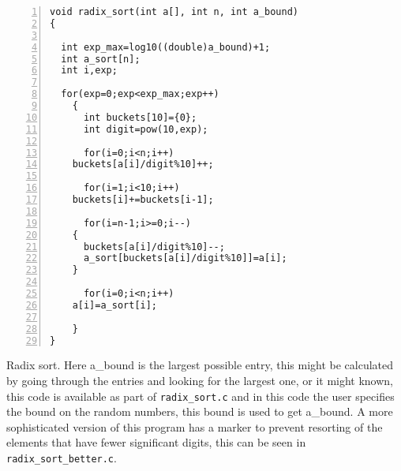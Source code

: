 \documentclass[11pt,a4paper]{scrartcl}
\begin{document}
\begin{table}
\begin{lstlisting}[numbers=left]
void radix_sort(int a[], int n, int a_bound)
{

  int exp_max=log10((double)a_bound)+1;
  int a_sort[n];
  int i,exp;

  for(exp=0;exp<exp_max;exp++)
    {
      int buckets[10]={0};
      int digit=pow(10,exp);

      for(i=0;i<n;i++)
	buckets[a[i]/digit%10]++;

      for(i=1;i<10;i++)
	buckets[i]+=buckets[i-1];

      for(i=n-1;i>=0;i--)
	{
	  buckets[a[i]/digit%10]--;
	  a_sort[buckets[a[i]/digit%10]]=a[i];
	}

      for(i=0;i<n;i++)
	a[i]=a_sort[i];

    }
}
\end{lstlisting}
\caption{Radix sort. Here a\_bound is the largest possible entry, this
  might be calculated by going through the entries and looking for the
  largest one, or it might known, this code is available as part of
  {\tt radix\_sort.c} and in this code the user specifies the bound on
  the random numbers, this bound is used to get a\_bound. A more
  sophisticated version of this program has a marker to prevent
  resorting of the elements that have fewer significant digits, this
  can be seen in {\tt radix\_sort\_better.c}.\label{c_radix}}
\end{table}
\end{document}
